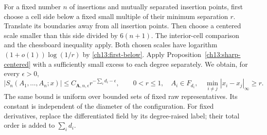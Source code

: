 For a fixed number $n$ of insertions and mutually separated insertion points, first choose a
cell side below a fixed small multiple of their minimum separation $r$.
Translate its boundaries away from all insertion points. Then choose a centered
scale smaller than this side divided by $6(n+1)$.
The interior-cell comparison and the chessboard inequality apply.
Both chosen scales have logarithm $(1+o(1))\log(1/r)$ by
\eqref{ch13:first-below}. Apply Proposition~\ref{ch13:sharp-centered}
with a sufficiently small excess to each degree separately. We obtain,
for every $\epsilon>0$,
\begin{equation}
 |S_n(A_1,\ldots,A_n;x)|
    \le C_{\boldsymbol A,n,\epsilon}
             r^{-\sum_i d_i-\epsilon},\qquad 0<r\le1,
 \quad A_i\in F_{d_i},\quad\min_{i\ne j}|x_i-x_j|_\infty\ge r.
 \label{ch13:sharp-separated}
\end{equation}
The same bound is uniform over bounded sets of fixed raw representatives.
Its constant is independent of the diameter of the configuration.
For fixed derivatives, replace the differentiated field by its degree-raised
label; their total order is added to $\sum_i d_i$.

